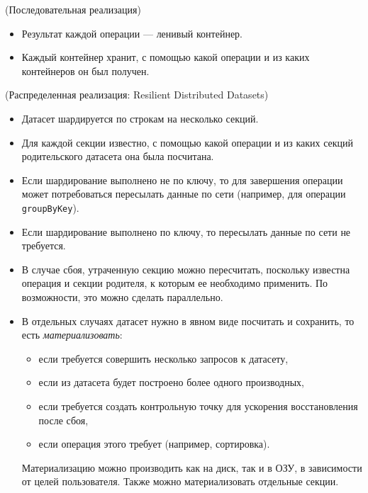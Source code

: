 \begin{algorithm}(Последовательная реализация)
  \begin{itemize}
    \item Результат каждой операции --- ленивый контейнер.
    \item Каждый контейнер хранит, с помощью какой операции и из каких контейнеров он был получен.
  \end{itemize}
\end{algorithm}

\begin{algorithm}(Распределенная реализация: Resilient Distributed Datasets)
  \begin{itemize}
    \item Датасет шардируется по строкам на несколько секций.
    \item Для каждой секции известно, с помощью какой операции и из каких секций родительского датасета она была посчитана.
    \item Если шардирование выполнено не по ключу, то для завершения операции может потребоваться
        пересылать данные по сети (например, для операции \texttt{groupByKey}).
    \item Если шардирование выполнено по ключу, то пересылать данные по сети не требуется.
    \item В случае сбоя, утраченную секцию можно пересчитать, поскольку
      известна операция и секции родителя, к которым ее необходимо применить.
      По возможности, это можно сделать параллельно.
    \item В отдельных случаях датасет нужно в явном виде посчитать и сохранить, то есть \textit{материализовать}:
      \begin{itemize}
        \item если требуется совершить несколько запросов к датасету,
        \item если из датасета будет построено более одного производных,
        \item если требуется создать контрольную точку для ускорения
          восстановления после сбоя,
        \item если операция этого требует (например, сортировка).
      \end{itemize}
      Материализацию можно производить как на диск, так и в ОЗУ, в зависимости
      от целей пользователя. Также можно материализовать отдельные секции.
  \end{itemize}
\end{algorithm}

